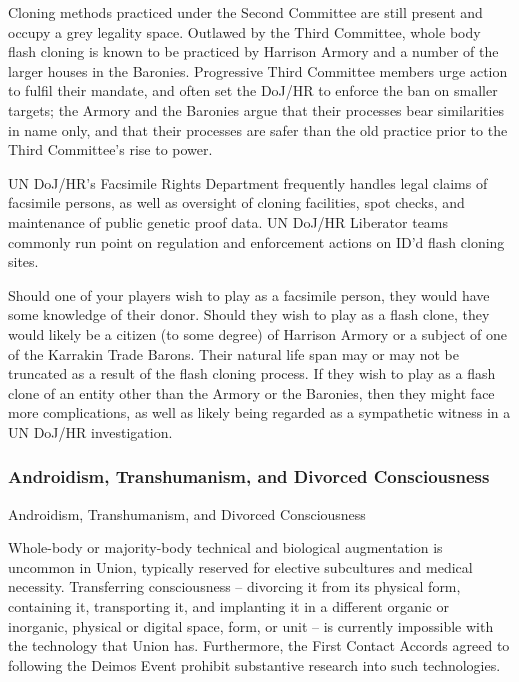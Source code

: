 Cloning methods practiced under the Second Committee are still present and occupy a grey  
legality space. Outlawed by the Third Committee, whole body flash cloning is known to be  
practiced by Harrison Armory and a number of the larger houses in the Baronies. Progressive  
Third Committee members urge action to fulfil their mandate, and often set the DoJ/HR to  
enforce the ban on smaller targets; the Armory and the Baronies argue that their processes bear  
similarities in name only, and that their processes are safer than the old practice prior to the Third  
Committee’s rise to power. 
 

UN DoJ/HR’s Facsimile Rights Department frequently handles legal claims of facsimile persons,  
as well as oversight of cloning facilities, spot checks, and maintenance of public genetic proof  
data. UN DoJ/HR Liberator teams commonly run point on regulation and enforcement actions on  
ID’d flash cloning sites. 
 

                                                                                                          


Should one of your players wish to play as a facsimile person, they would have some knowledge  
of their donor. Should they wish to play as a flash clone, they would likely be a citizen (to some  
degree) of Harrison Armory or a subject of one of the Karrakin Trade Barons. Their natural life  
span may or may not be truncated as a result of the flash cloning process. If they wish to play as  
a flash clone of an entity other than the Armory or the Baronies, then they might face more  
complications, as well as likely being regarded as a sympathetic witness in a UN DoJ/HR  
investigation. 
 
\subsubsection{Androidism, Transhumanism, and Divorced Consciousness}
Androidism, Transhumanism, and Divorced Consciousness  

Whole-body or majority-body technical and biological augmentation is uncommon in Union,  
typically reserved for elective subcultures and medical necessity. Transferring consciousness --  
divorcing it from its physical form, containing it, transporting it, and implanting it in a different  
organic or inorganic, physical or digital space, form, or unit -- is currently impossible with the  
technology that Union has. Furthermore, the First Contact Accords agreed to following the  
Deimos Event prohibit substantive research into such technologies.  
 

